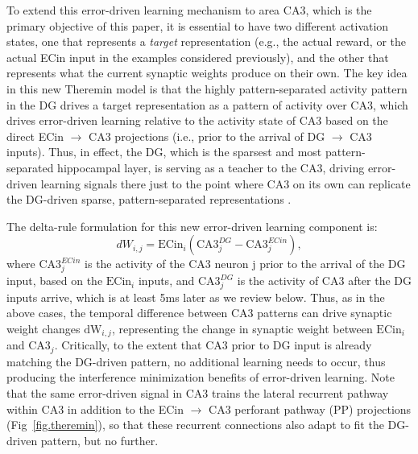 \documentclass[11pt,twoside]{article}
\newif\myifpdf
\begin{document}
To extend this error-driven learning mechanism to area CA3, which is the primary objective of this paper, it is essential to have two different activation states, one that represents a \emph{target} representation (e.g., the actual reward, or the actual ECin input in the examples considered previously), and the other that represents what the current synaptic weights produce on their own.  The key idea in this new Theremin model is that the highly pattern-separated activity pattern in the DG drives a target representation as a pattern of activity over CA3, which drives error-driven learning relative to the activity state of CA3 based on the direct ECin $\rightarrow$ CA3 projections (i.e., prior to the arrival of DG $\rightarrow$ CA3 inputs).  Thus, in effect, the DG, which is the sparsest and most pattern-separated hippocampal layer, is serving as a teacher to the CA3, driving error-driven learning signals there just to the point where CA3 on its own can replicate the DG-driven sparse, pattern-separated representations \citep{KowadloAhmedRawlinson20}.

The delta-rule formulation for this new error-driven learning component is:
\begin{equation}
\label{eq.CA3EDL}
    dW_{i,j} = \mbox{ECin}_i (\mbox{CA3}_j^{DG} - \mbox{CA3}_j^{ECin} ) ,
\end{equation}
where $\mbox{CA3}_j^{ECin}$ is the activity of the CA3 neuron $\mbox{j}$ prior to the arrival of the DG input, based on the $\mbox{ECin}_i$ inputs, and $\mbox{CA3}_j^{DG}$ is the activity of CA3 after the DG inputs arrive, which is at least 5ms later as we review below. Thus, as in the above cases, the temporal difference between CA3 patterns can drive synaptic weight changes $\mbox{dW}_{i,j}$, representing the change in synaptic weight between $\mbox{ECin}_i$ and $\mbox{CA3}_j$.  Critically, to the extent that CA3 prior to DG input is already matching the DG-driven pattern, no additional learning needs to occur, thus producing the interference minimization benefits of error-driven learning.  Note that the same error-driven signal in CA3 trains the lateral recurrent pathway within CA3 in addition to the ECin $\rightarrow$ CA3 perforant pathway (PP) projections (Fig~\ref{fig.theremin}), so that these recurrent connections also adapt to fit the DG-driven pattern, but no further.
\end{document}
